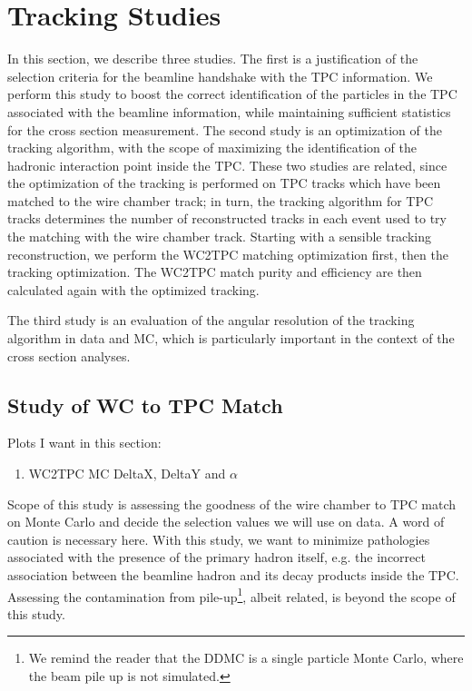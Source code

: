 \section{Tracking Studies}\label{sec:TrackingStudies}
In this section, we describe three studies. The first is a justification of the selection criteria for the beamline handshake with the TPC information.  We perform this study to boost  the correct identification of the particles in the TPC associated with the beamline information, while maintaining sufficient statistics for the cross section measurement.  The second study is an optimization of the tracking algorithm, with the scope of maximizing the identification of the hadronic interaction point inside the TPC.  These two studies are related, since the optimization of the tracking is performed on TPC tracks which have been matched to the wire chamber track; in turn, the tracking algorithm for TPC tracks determines the number of reconstructed tracks in each event used to try the matching with the wire chamber track. Starting with a sensible tracking reconstruction, we perform the WC2TPC matching optimization first, then the tracking optimization. The WC2TPC match purity and efficiency  are then calculated again with the optimized tracking.

The third study is an evaluation of  the angular resolution of the tracking algorithm in data and MC, which is particularly important in the context of the cross section analyses.



\subsection{Study of WC to TPC Match}\label{ch:WC2TPCMatchOptimization}

Plots I want in this section:
\begin{enumerate}
\item WC2TPC MC DeltaX, DeltaY and $\alpha$
\end{enumerate}


Scope of this study is assessing the goodness of the wire chamber to TPC match on Monte Carlo and decide the selection values we will use on data. A word of caution is necessary here. With this study, we want to minimize pathologies associated with the presence of the primary hadron itself, e.g. the incorrect association between the beamline hadron and its decay products inside the TPC.  Assessing the contamination from pile-up\footnote{We remind the reader that the DDMC is a single particle Monte Carlo, where the beam pile up is not simulated.}, albeit related, is beyond the scope of this study.

